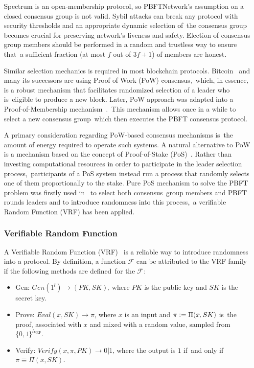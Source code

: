 Spectrum is an open-membership protocol, so PBFTNetwork's assumption on a closed consensus group is not valid.
Sybil attacks can break any protocol with security thresholds and an appropriate dynamic selection of\
the consensus group becomes crucial for preserving network's liveness and safety.
Election of consensus group members should be performed in a random and trustless way to ensure that\
a sufficient fraction (at most $f$ out of ${3 f + 1}$) of members are honest.

Similar selection mechanics is required in most blockchain protocols.
Bitcoin~\cite{nakamoto2009bitcoin} and many its successors are using Proof-of-Work (PoW) consensus,\
which, in essence, is a robust mechanism that facilitates randomized selection of a leader who is\
eligible to produce a new block.
Later, PoW approach was adapted into a Proof-of-Membership mechanism~\cite{kokoriskogias2016enhancing}.\
This mechanism allows once in a while to select a new consensus group\
which then executes the PBFT consensus protocol.

A primary consideration regarding PoW-based consensus mechanisms is\
the amount of energy required to operate such systems.
A natural alternative to PoW is a mechanism based on the concept of Proof-of-Stake (PoS)~\cite{King2012PPCoinPC}.
Rather than investing computational resources in order to participate in the leader selection process,\
participants of a PoS system instead run a process that randomly selects one of them proportionally to the stake.
Pure PoS mechanism to solve the PBFT problem was firstly used in~\cite{cryptoeprint:2017/454} to select both consensus\
group members and PBFT rounds leaders and to introduce randomness into this process,\
a verifiable Random Function (VRF) has been applied.

\subsubsection{Verifiable Random Function}

A Verifiable Random Function (VRF)~\cite{Micali1999} is a reliable way to introduce randomness into a protocol.
By definition, a function $\mathcal{F}$ can be attributed to the VRF family if the following methods are defined\
for the $\mathcal{F}$:
\begin{itemize}
    \item Gen: ${Gen(1^l) \rightarrow (PK, SK)}$, where $PK$ is the public key and $SK$ is the secret key.
    \item Prove: ${Eval(x, SK) \rightarrow \pi}$, where $x$ is an input and $\pi \vcentcolon= \Pi(x, SK)$ is\
    the proof, associated with $x$ and mixed with a random value, sampled from $\{0,1\}^{l_{\text{VRF}}}$.
    \item Verify: ${Verify(x, \pi, PK) \rightarrow 0 | 1}$, where the output is $1$ if\
    and only if ${\pi \equiv \Pi(x, SK)}$.
\end{itemize}

